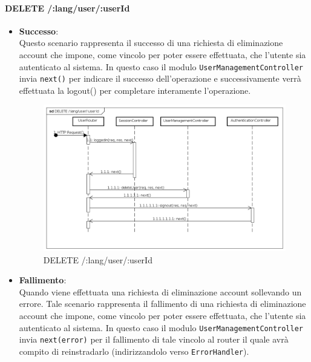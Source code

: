 
\paragraph{DELETE /:lang/user/:userId}
\begin{itemize}
\item \textbf{Successo}: \\
Questo scenario rappresenta il successo di una richiesta di eliminazione account che impone, come vincolo per poter essere effettuata, che l'utente sia autenticato al sistema.  
In questo caso il modulo \texttt{UserManagementController} invia \texttt{next()} per indicare il successo dell'operazione e successivamente verrà effettuata la logout() per completare interamente l'operazione.
\label{Procedura di eliminazione account}
\begin{figure}[ht]
	\centering
	\includegraphics[scale=0.40]{UML/DiagrammiDiSequenza/Back-end/DELETE_LangUserUseridSuccess.png}
	\caption{DELETE /:lang/user/:userId}
\end{figure}
\FloatBarrier

\item \textbf{Fallimento}: \\
Quando viene effettuata una richiesta di eliminazione account sollevando un errore. Tale scenario rappresenta il fallimento di una richiesta di eliminazione account che impone, come vincolo per poter essere effettuata, che l'utente sia autenticato al sistema. In questo caso il modulo \texttt{UserManagementController} invia \texttt{next(error)} per il fallimento di tale vincolo al router il quale avrà compito di reinstradarlo (indirizzandolo verso \texttt{ErrorHandler}).


\end{itemize}
